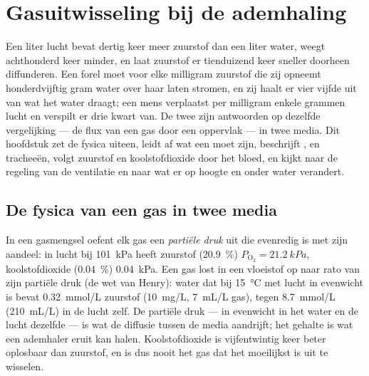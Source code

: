 \chapter{Gasuitwisseling bij de ademhaling}\label{ch:b1:gas-exchange}

Een liter lucht bevat dertig keer meer zuurstof dan een liter water, weegt
achthonderd keer minder, en laat zuurstof er tienduizend keer sneller doorheen
diffunderen. Een forel moet voor elke milligram zuurstof die zij opneemt
honderdvijftig gram water over haar  laten stromen, en zij haalt er vier
vijfde uit van wat het water draagt; een mens verplaatst per milligram enkele
grammen lucht en verspilt er drie kwart van. De twee  zijn antwoorden op
dezelfde vergelijking --- de flux van een gas door een oppervlak --- in twee media.
Dit hoofdstuk zet de fysica uiteen, leidt af wat een  moet
zijn, beschrijft ,  en tracheeën, volgt zuurstof en koolstofdioxide
door het bloed, en kijkt naar de regeling van de ventilatie en naar wat er op
hoogte en onder water verandert.

\section{De fysica van een gas in twee media}

\begin{definition}\label{def:b1:gas-exchange:partial}
In een gasmengsel oefent elk gas een \emph{partiële druk} uit die evenredig is met
zijn aandeel: in lucht bij \qty{101}{kPa} heeft zuurstof (\qty{20.9}{\%})
$P_{\mathrm{O_2}} = \qty{21.2}{kPa}$, koolstofdioxide (\qty{0.04}{\%})
\qty{0.04}{kPa}. Een gas lost in een vloeistof op naar rato van zijn partiële druk
(de wet van Henry): water dat bij \qty{15}{\celsius} met lucht in evenwicht is
bevat \qty{0.32}{mmol/L} zuurstof (\qty{10}{mg/L}, \qty{7}{mL/L} gas), tegen
\qty{8.7}{mmol/L} (\qty{210}{mL/L}) in de lucht zelf. De partiële druk --- in
evenwicht in het water en de lucht dezelfde --- is wat de diffusie tussen de media
aandrijft; het gehalte is wat een ademhaler eruit kan halen. Koolstofdioxide is
vijfentwintig keer beter oplosbaar dan zuurstof, en is dus nooit het gas dat het
moeilijkst is uit te wisselen.
\end{definition}


